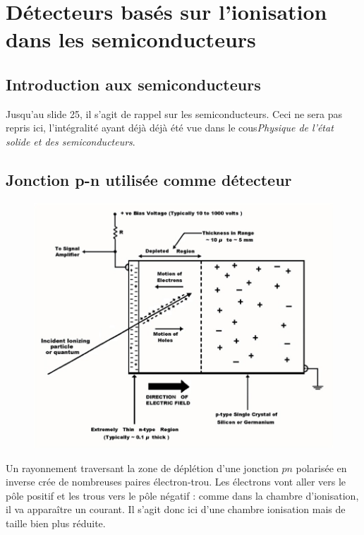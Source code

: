 \chapter{Détecteurs basés sur l'ionisation dans les semiconducteurs}
\section{Introduction aux semiconducteurs}
Jusqu'au slide 25, il s'agit de rappel sur les semiconducteurs. Ceci ne sera pas repris ici, 
l'intégralité ayant déjà déjà été vue dans le cous\textit{Physique de l'état solide et des 
semiconducteurs}.



\section{Jonction p-n utilisée comme détecteur}%
	\begin{figure}
	\vspace{-5mm}
	\includegraphics[scale=0.35]{ch9/image1}
	\end{figure}
	
Un rayonnement traversant la zone de déplétion d'une jonction $pn$ polarisée en inverse crée de
nombreuses paires électron-trou. Les électrons vont aller vers le pôle positif et les trous vers
le pôle négatif : comme dans la chambre d'ionisation, il va apparaître un courant. Il s'agit donc
ici d'une chambre ionisation mais de taille bien plus réduite.\\

